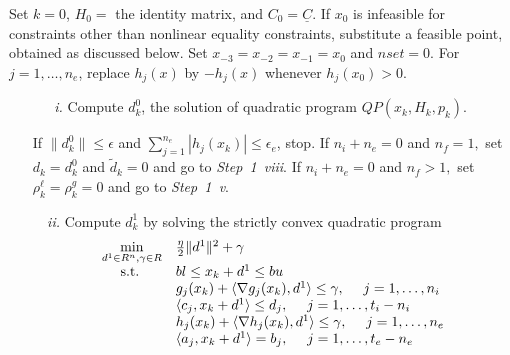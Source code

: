 \smallskip
{} Set $k=0$, $H_0=$ the identity 
matrix, and $C_0 = \underline{C}.$ If $x_0$ is infeasible for 
constraints other than nonlinear equality constraints, substitute a
feasible point, obtained as discussed below. 
Set $x_{-3}=x_{-2}=x_{-1}=x_0$ and $nset=0$.
For $j=1,\ldots,n_e$, replace $h_j(x)$ by $-h_j(x)$ whenever
$h_j(x_0)>0$.

\smallskip
{}

\begin{itemize}
\item[\it ~~~i.] Compute $d_{k}^{0}$, the solution of quadratic program
$QP(x_k,H_k,p_k)$.

If $\|d_k^0\|\leq \epsilon$
and $\sum_{j=1}^{n_e}|h_j(x_k)|\leq\epsilon_e$, stop. 
If $n_i+n_e=0$ and $n_f=1,$ set $d_k=d^0_k$ and $\tilde d_k =0$ and 
go to {\it Step~1~viii}. If $n_i+n_e=0$ and $n_f >1,$ 
set $\rho _k^{\ell}=\rho _k^g=0$ and go to {\it Step~1~v}.

\item[\it ~~ii.] Compute $d_{k}^{1}$ by solving the strictly convex 
quadratic program
\smallskip
$$  \begin{array}{ll} \min\limits_{d^1\in R^n,\gamma \in R}  
                                 & \frac{\eta}{2}\|d^1\|^2+\gamma \\
  {\rm ~~~~s.t.} &  bl \leq x_k+d^1 \leq bu\\
      &  g_j(x_k)+\langle \nabla g_j(x_k),d^1 \rangle
       \leq\gamma, ~~~~j=1,\ldots,n_i\\
      & \langle c_j,x_k  + d^1 \rangle \leq d_j,
            ~~~~j=1,\ldots,t_i-n_i \\
      &  h_j(x_k)+\langle \nabla h_j(x_k),d^1 \rangle
       \leq\gamma, ~~~~j=1,\ldots,n_e\\
      & \langle a_j,x_k  + d^1 \rangle=b_j,
                      ~~~~j=1,\ldots,t_e-n_e\end{array}$$


\end{itemize}
